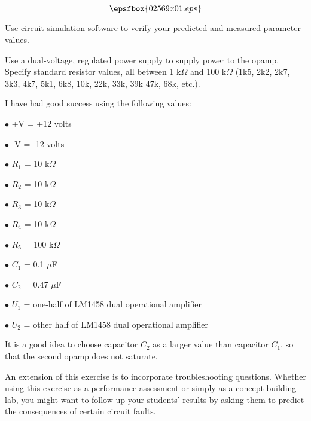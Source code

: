 

$$\epsfbox{02569x01.eps}$$

\vfil \eject






Use circuit simulation software to verify your predicted and measured parameter values.







Use a dual-voltage, regulated power supply to supply power to the opamp.  Specify standard resistor values, all between 1 k$\Omega$ and 100 k$\Omega$ (1k5, 2k2, 2k7, 3k3, 4k7, 5k1, 6k8, 10k, 22k, 33k, 39k 47k, 68k, etc.).

I have had good success using the following values:

\medskip
\item{$\bullet$} +V = +12 volts
\item{$\bullet$} -V = -12 volts
\item{$\bullet$} $R_1$ = 10 k$\Omega$
\item{$\bullet$} $R_2$ = 10 k$\Omega$
\item{$\bullet$} $R_3$ = 10 k$\Omega$
\item{$\bullet$} $R_4$ = 10 k$\Omega$
\item{$\bullet$} $R_5$ = 100 k$\Omega$
\item{$\bullet$} $C_1$ = 0.1 $\mu$F
\item{$\bullet$} $C_2$ = 0.47 $\mu$F
\item{$\bullet$} $U_1$ = one-half of LM1458 dual operational amplifier
\item{$\bullet$} $U_2$ = other half of LM1458 dual operational amplifier
\medskip

It is a good idea to choose capacitor $C_2$ as a larger value than capacitor $C_1$, so that the second opamp does not saturate.

An extension of this exercise is to incorporate troubleshooting questions.  Whether using this exercise as a performance assessment or simply as a concept-building lab, you might want to follow up your students' results by asking them to predict the consequences of certain circuit faults.




